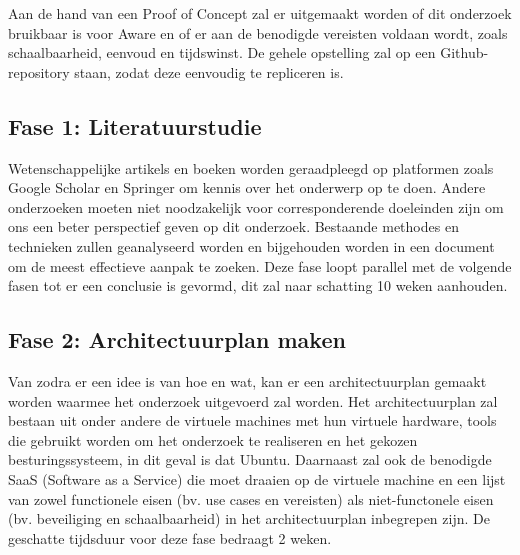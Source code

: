 Aan de hand van een Proof of Concept zal er uitgemaakt worden of dit onderzoek bruikbaar is voor Aware en of er aan de benodigde 
vereisten voldaan wordt, zoals schaalbaarheid, eenvoud en tijdswinst. De gehele opstelling zal op een Github-repository staan, zodat 
deze eenvoudig te repliceren is.

\subsection{Fase 1: Literatuurstudie}
\label{subsec:Fase 1: Literatuurstudie}
Wetenschappelijke artikels en boeken worden geraadpleegd op platformen zoals Google Scholar en Springer om 
kennis over het onderwerp op te doen. 
Andere onderzoeken moeten niet noodzakelijk voor corresponderende doeleinden zijn om ons een beter perspectief geven op dit onderzoek. 
Bestaande methodes en technieken zullen geanalyseerd worden en bijgehouden worden in een document om de meest effectieve aanpak te zoeken.
Deze fase loopt parallel met de volgende fasen tot er een conclusie is gevormd, dit zal naar schatting 10 weken aanhouden.

\subsection{Fase 2: Architectuurplan maken}
\label{subsec:Fase 2: Architectuurplan maken}
Van zodra er een idee is van hoe en wat, kan er een architectuurplan gemaakt worden waarmee het onderzoek uitgevoerd zal worden. 
Het architectuurplan zal bestaan uit onder andere de virtuele machines met hun virtuele hardware, tools die gebruikt worden om 
het onderzoek te realiseren en het gekozen besturingssysteem, in dit geval is dat Ubuntu.
Daarnaast zal ook de benodigde SaaS (Software as a Service) die moet draaien op de virtuele machine en een lijst van zowel functionele eisen 
(bv. use cases en vereisten) als niet-functonele eisen (bv. beveiliging en schaalbaarheid) in het architectuurplan inbegrepen zijn. 
De geschatte tijdsduur voor deze fase bedraagt 2 weken.

